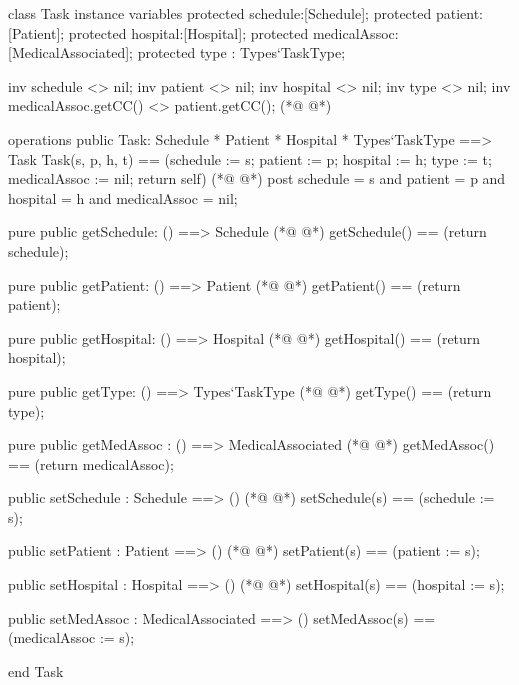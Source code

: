 \begin{vdmpp}[breaklines=true]
class Task
instance variables
  protected schedule:[Schedule];
  protected patient:[Patient];
  protected hospital:[Hospital];
  protected medicalAssoc:[MedicalAssociated];
  protected type : Types`TaskType;
  
  inv schedule <> nil;
  inv patient <> nil;
  inv hospital <> nil;
  inv type <> nil;
  inv medicalAssoc.getCC() <> patient.getCC();
(*@
\label{Task:14}
@*)
  
operations
 public Task: Schedule * Patient * Hospital * Types`TaskType ==> Task
  Task(s, p, h, t) == (schedule := s; patient := p; hospital := h; type := t; medicalAssoc := nil; return self)
(*@
\label{getSchedule:18}
@*)
 post schedule = s and patient = p and hospital = h and medicalAssoc = nil;
 
 pure public getSchedule: () ==> Schedule
(*@
\label{getPatient:21}
@*)
  getSchedule() == (return schedule);
  
 pure public getPatient: () ==> Patient
(*@
\label{getHospital:24}
@*)
  getPatient() == (return patient);
  
 pure public getHospital: () ==> Hospital
(*@
\label{getMedAssoc:27}
@*)
  getHospital() == (return hospital);
  
 pure public getType: () ==> Types`TaskType
(*@
\label{setSchedule:30}
@*)
  getType() == (return type);
  
 pure public getMedAssoc : () ==> MedicalAssociated
(*@
\label{setPatient:33}
@*)
  getMedAssoc() == (return medicalAssoc);
  
 public setSchedule : Schedule ==> ()
(*@
\label{setHospital:36}
@*)
  setSchedule(s) == (schedule := s);
  
 public setPatient : Patient ==> ()
(*@
\label{setMedAssoc:39}
@*)
  setPatient(s) == (patient := s);
  
 public setHospital : Hospital ==> ()
(*@
\label{getType:42}
@*)
  setHospital(s) == (hospital := s);
 
 public setMedAssoc : MedicalAssociated ==> ()
  setMedAssoc(s) == (medicalAssoc := s);

end Task
\end{vdmpp}
